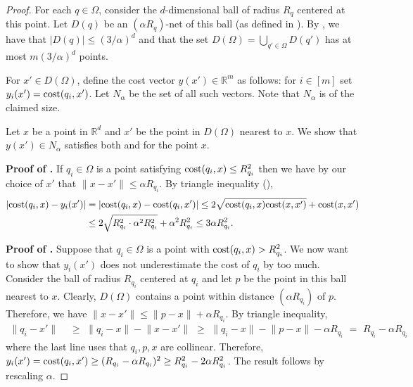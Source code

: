 \documentclass[11pt]{article}
\theoremstyle{restate}
\theoremstyle{definition}
\newcommand{\R}{\ensuremath{\mathbb{R}}}
\newcommand{\norm}[1]{\ensuremath{\|#1\|}}
\newcommand{\cost}{\textnormal{cost}}
\begin{document}
\begin{proof}
For each $q \in \Omega$, consider the $d$-dimensional ball of radius $R_q$ centered at this point. Let $D(q)$ be an $(\alpha R_q)$-net of this ball (as defined in ).  By , we have that $|D(q)| \leq (3/\alpha)^d$ and that the set $D(\Omega) = \bigcup_{q' \in \Omega} D(q')$  has at most $m (3/\alpha)^d$ points.

For $x' \in D(\Omega)$, define the cost vector $y(x') \in \R^m$ as follows: for $i \in [m]$ set $y_i(x') = \cost(q_i, x')$. Let $N_\alpha$ be the set of all such vectors. Note that $N_\alpha$ is of the claimed size.
 
Let $x$ be a point in $\R^d$ and $x'$ be the point in  $D(\Omega)$ nearest to $x$. We show that $y(x') \in N_\alpha$ satisfies both  and  for the point $x$. 

\textbf{Proof of .} If $q_i \in \Omega$ is a point satisfying $\cost(q_i,x) \leq R_{q_i}^2$ then we have by our choice of $x'$ that $\norm{x - x'} \leq \alpha R_{q_i}$. By triangle inequality (), 
\begin{align*}
    |\cost(q_i,x) - y_i(x')| &= |\cost(q_i,x) - \cost(q_i,x')| 
            \leq 2\sqrt{\cost(q_i,x) \cost(x,x')} + \cost(x,x') \\
            &\leq 2 \sqrt{R_{q_i}^2 \cdot \alpha^2 R_{q_i}^2} + \alpha^2 R_{q_i}^2 \leq 3\alpha R_{q_i}^2.
\end{align*}

\textbf{Proof of .} Suppose that $q_i \in \Omega$ is a point with $\cost(q_i,x)> R_{q_i}^2$. We now want to show that $y_i(x')$ does not underestimate the cost of $q_i$ by too much.   Consider the ball of radius $R_{q_i}$ centered at $q_i$ and let $p$ be the point in this ball nearest to $x$. Clearly, $D(\Omega)$ contains a point within distance $(\alpha R_{q_i})$ of $p$. Therefore, we have $\norm{x-x'} \leq \norm{p-x} + \alpha R_{q_i}$. By triangle inequality,
\begin{align}
                \norm{{q_i}-x'} &\,\,\geq \,\, \norm{{q_i}-x} - \norm{x - x'} \,\,\geq\,\,\norm{{q_i} - x} - \norm{p-x} - \alpha R_{q_i} \,\,= \,\,R_{q_i} - \alpha R_{q_i} 
\end{align}
where the last line uses that ${q_i},p,x$ are collinear. Therefore, $y_i(x') = \cost({q_i},x') \geq (R_{q_i} - \alpha R_{q_i})^2 \geq R_{q_i}^2 - 2\alpha R_{q_i}^2$. The result follows by rescaling $\alpha$.
\end{proof}
\end{document}
